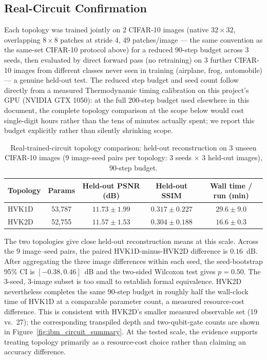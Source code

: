 \documentclass[11pt]{article}
\begin{document}
\subsection{Real-Circuit Confirmation}
\label{sec:topology_real_circuit}
Each topology was trained jointly on 2 CIFAR-10 images (native $32\times32$, overlapping $8\times8$ patches at stride 4, 49 patches/image --- the same convention as the same-set CIFAR-10 protocol above) for a reduced 90-step budget across 3 seeds, then evaluated by direct forward pass (no retraining) on 3 further CIFAR-10 images from different classes never seen in training (airplane, frog, automobile) --- a genuine held-out test. The reduced step budget and seed count follow directly from a measured Thermodynamic timing calibration on this project's GPU (NVIDIA GTX 1050): at the full 200-step budget used elsewhere in this document, the complete topology comparison at the scope below would cost single-digit hours rather than the tens of minutes actually spent; we report this budget explicitly rather than silently shrinking scope.

\begin{table}[H]
\centering
\caption{Real-trained-circuit topology comparison: held-out reconstruction on 3 unseen CIFAR-10 images (9 image-seed pairs per topology: 3 seeds $\times$ 3 held-out images), 90-step budget.}
\label{tab:topology_real_circuit}
\scriptsize
\begin{tabular}{lcccc}
\toprule
Topology & Params & Held-out PSNR (dB) & Held-out SSIM & Wall time / run (min) \\
\midrule
HVK1D & 53{,}787 & $11.73\pm1.99$ & $0.317\pm0.227$ & $29.6\pm9.0$ \\
HVK2D & 52{,}755 & $11.57\pm1.53$ & $0.304\pm0.188$ & $16.6\pm0.3$ \\
\bottomrule
\end{tabular}
\end{table}

The two topologies give close held-out reconstruction means at this scale. Across the 9 image--seed pairs, the paired HVK1D-minus-HVK2D difference is $0.16$~dB. After aggregating the three image differences within each seed, the seed-bootstrap 95\% CI is $[-0.38,0.46]$~dB and the two-sided Wilcoxon test gives $p=0.50$. The 3-seed, 3-image subset is too small to establish formal equivalence. HVK2D nevertheless completes the same 90-step budget in roughly half the wall-clock time of HVK1D at a comparable parameter count, a measured resource-cost difference. This is consistent with HVK2D's smaller measured observable set (19 vs.\ 27); the corresponding transpiled depth and two-qubit-gate counts are shown in Figure~\ref{fig:ibm_circuit_summary}. At the tested scale, the evidence supports treating topology primarily as a resource-cost choice rather than claiming an accuracy difference.
\end{document}

